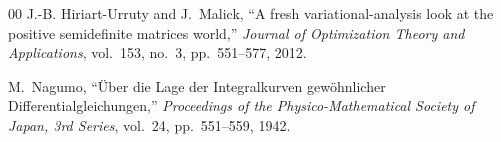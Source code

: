 \documentclass[conference]{IEEEtran}
\begin{document}
\begin{thebibliography}{00}
		J.-B. Hiriart-Urruty and J.~Malick,
		``A fresh variational-analysis look at the positive semidefinite
		matrices world,''
		\emph{Journal of Optimization Theory and Applications},
		vol.~153, no.~3, pp.~551--577, 2012.
		
		M.~Nagumo,
		``\"Uber die Lage der Integralkurven gew\"ohnlicher
		Differentialgleichungen,''
		\emph{Proceedings of the Physico-Mathematical Society of Japan,
			3rd Series},
		vol.~24, pp.~551--559, 1942.
		
	\end{thebibliography}
	
\end{document}
